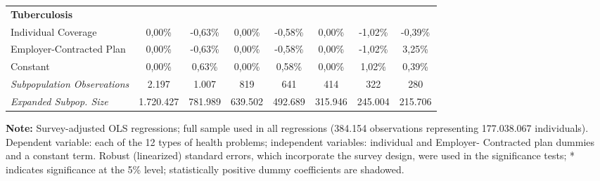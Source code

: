 \documentclass{article}
\begin{document}
\begin{table*}
{\begin{tabular}{l*{7}{c}}
\midrule
\textbf{Tuberculosis}  & & & & & & & \\

Individual Coverage      &  0,00\%         & -0,63\%\sym{*}  &  0,00\%         & -0,58\%\sym{*}  &  0,00\%         & -1,02\%         & -0,39\%         \\
Employer-Contracted Plan &  0,00\%         & -0,63\%\sym{*}  &  0,00\%         & -0,58\%\sym{*}  &  0,00\%         & -1,02\%         &  3,25\%         \\
Constant                 &  0,00\%         &  0,63\%\sym{*}  &  0,00\%         &  0,58\%\sym{*}  &  0,00\%         &  1,02\%         &  0,39\%         \\

\midrule

\textit{Subpopulation Observations} 	& 2.197 & 1.007 & 819 & 641 & 414 & 322 & 280         \\
\textit{Expanded Subpop. Size} 		& 1.720.427 & 781.989 & 639.502 & 492.689 & 315.946 & 245.004 & 215.706      \\

	\hline \hline

\end{tabular}}

\justify \small {} \textbf{Note:} Survey-adjusted OLS regressions; full sample used in all regressions (384.154 observations representing 177.038.067
individuals). Dependent variable: each of the 12 types of health problems; independent variables: individual and Employer-
Contracted plan dummies and a constant term. Robust (linearized) standard errors, which incorporate the survey design, were
used in the significance tests; * indicates significance at the 5\% level; statistically positive dummy coefficients are shadowed.

\end{table*}












\newpage
\end{document}
